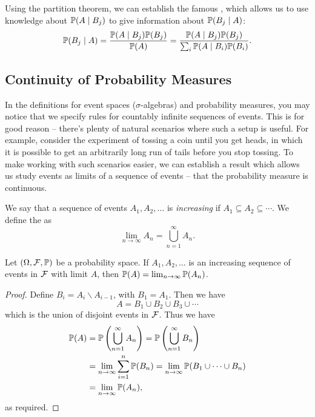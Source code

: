 \documentclass[10pt, a4paper]{article}
\begin{document}
Using the partition theorem, we can establish the famous , which allows us to use knowledge about $\mathbb{P}(A \mid B_j)$ to give information about $\mathbb{P}(B_j \mid A)$:
$$
\mathbb{P}(B_j \mid A) = \frac{\mathbb{P}(A \mid B_j) \mathbb{P}(B_j)}{\mathbb{P}(A)} = \frac{\mathbb{P}(A \mid B_j) \mathbb{P}(B_j)}{\sum_i \mathbb{P}(A \mid B_i) \mathbb{P}(B_i)}.
$$



\subsection{Continuity of Probability Measures}

In the definitions for event spaces ($\sigma$-algebras) and probability measures, you may notice that we specify rules for countably infinite sequences of events. This is for good reason -- there's plenty of natural scenarios where such a setup is useful. For example, consider the experiment of tossing a coin until you get heads, in which it is possible to get an arbitrarily long run of tails before you stop tossing. To make working with such scenarios easier, we can establish a result which allows us study events as limits of a sequence of events -- that the probability measure is continuous.


\begin{definition}
	We say that a sequence of events $A_1, A_2, \dots$ is \emph{increasing} if $A_1 \subseteq A_2 \subseteq \cdots$. We define the  as
	$$
	\lim_{n \to \infty} A_n = \bigcup_{n = 1}^{\infty} A_n.
	$$
\end{definition}

\begin{theorem}
	Let $(\Omega, \mathcal{F},\mathbb{P})$ be a probability space. If $A_1, A_2, \dots$ is an increasing sequence of events in $\mathcal{F}$ with limit $A$, then $\mathbb{P}(A) = \lim_{n \to \infty} \mathbb{P}(A_n)$.
\end{theorem}
\begin{proof}
	Define $B_i = A_i \backslash A_{i - 1}$, with $B_1 = A_1$. Then we have
	$$
A = B_1 \cup B_2 \cup B_3 \cup \cdots
	$$
	which is the union of disjoint events in $\mathcal{F}$. Thus we have
	\begin{align*}
		\mathbb{P}(A) &= \mathbb{P}\left(\bigcup_{n = 1}^{\infty} A_n\right) = \mathbb{P}\left(\bigcup_{n = 1}^{\infty} B_n\right) \\
		&= \lim_{n \to \infty} \sum_{i = 1}^{n} \mathbb{P}(B_n) = \lim_{n \to \infty} \mathbb{P}(B_1 \cup \cdots \cup B_n) \\ &= \lim_{n \to \infty} \mathbb{P}(A_n),
	\end{align*}
	as required.
\end{proof}
\end{document}
